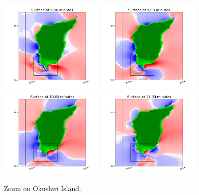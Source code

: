 \begin{figure}[ht]
\hfil\includegraphics[width=2.0in]{bp9/ok_8min.png}\hfil
\vskip 10pt
\hfil\includegraphics[width=2.0in]{bp9/ok_9min.png}\hfil
\hfil\includegraphics[width=2.0in]{bp9/ok_10min.png}\hfil
\hfil\includegraphics[width=2.0in]{bp9/ok_11min.png}\hfil
\caption{\label{bp9ok}
Zoom on Okushiri Island.
  }
\end{figure}

